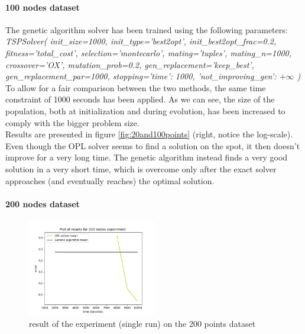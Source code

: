 \documentclass{article}
\begin{document}
\paragraph*{100 nodes dataset}

The genetic algorithm solver has been trained using the following parameters: \\
\newpage
\textit{TSPSolver(
        init\_size=1000, init\_type='best2opt', init\_best2opt\_frac=0.2, fitness='total\_cost',
        selection='montecarlo', mating='tuples', mating\_n=1000, crossover='OX', mutation\_prob=0.2,
        gen\_replacement='keep\_best', gen\_replacement\_par=1000,
        stopping={'time': 1000, 'not\_improving\_gen': $+\infty$}
    )} \\
\newline
To allow for a fair comparison between the two methods, the same time constraint of 1000 seconds has been applied. As we can see, the size of the population, both at initialization and during evolution, has been increased to comply with the bigger problem size. \\
Results are presented in figure \ref{fig:20and100points} (right, notice the log-scale). Even though the OPL solver seems to find a solution on the spot, it then doesn't improve for a very long time. The genetic algorithm instead finds a very good solution in a very short time, which is overcome only after the exact solver approaches (and eventually reaches) the optimal solution.


\paragraph*{200 nodes dataset}

\begin{figure}
    \centering
\includegraphics[width=0.5\textwidth]{pics/200_nodes_results.png}
\caption{result of the experiment (single run) on the 200 points dataset}
\label{fig:200points}
\end{figure}
\end{document}
